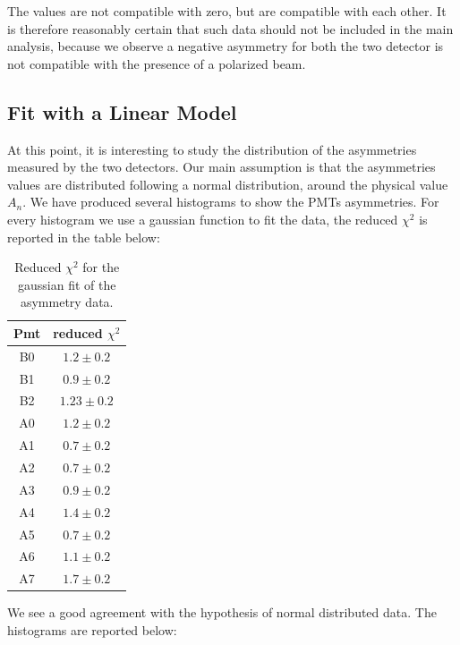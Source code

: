 The values are not compatible with zero, but are compatible with each other. It is therefore reasonably certain that such data should not be included in the main analysis, because we observe a negative asymmetry for both the two detector is not compatible with the presence of a polarized beam.
\newpage
\subsection{Fit with a Linear Model}

At this point, it is interesting to study the distribution of the asymmetries measured by the two detectors. Our main assumption is that the asymmetries values are distributed following a normal distribution, around the physical value $A_{n}$. We have produced several histograms to show the PMTs asymmetries. For every histogram we use a gaussian function to fit the data, the reduced $\chi^{2}$ is reported in the table below:

\begin{table}[!h]
\centering
\begin{tabular}{c|c}
\hline 
Pmt & reduced $\chi^{2}$ \\ 
\hline
B0 & $1.2 \pm 0.2$ \\ 
B1 & $0.9 \pm 0.2$ \\ 
B2 & $1.23 \pm 0.2$ \\
A0 & $1.2 \pm 0.2$ \\ 
A1 & $0.7 \pm 0.2$ \\ 
A2 & $0.7 \pm 0.2$ \\ 
A3 & $0.9 \pm 0.2$ \\ 
A4 & $1.4 \pm 0.2$ \\ 
A5 & $0.7 \pm 0.2$ \\ 
A6 & $1.1 \pm 0.2$ \\ 
A7 & $1.7 \pm 0.2$ \\ 
\hline 
\end{tabular}
\caption{Reduced $\chi^{2}$ for the gaussian fit of the asymmetry data.} 
\end{table}

We see a good agreement with the hypothesis of normal distributed data. The histograms are reported below:

